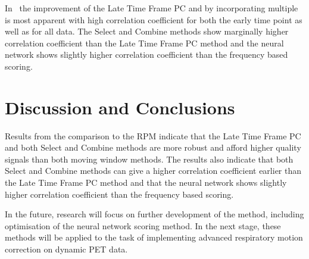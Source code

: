     In~ the improvement of the Late Time Frame \gls{PC} and by incorporating multiple  is most apparent with high correlation coefficient for both the early time point as well as for all data. The Select and Combine methods show marginally higher correlation coefficient than the Late Time Frame \gls{PC} method and the neural network shows slightly higher correlation coefficient than the frequency based scoring.
    

\vspace{-0.3cm}

\section{Discussion and Conclusions} \label{sec:discussion_and_conclusions}
    Results from the comparison to the \gls{RPM} indicate that the Late Time Frame \gls{PC} and both Select and Combine methods are more robust and afford higher quality signals than both moving window methods. The results also indicate that both Select and Combine methods can give a higher correlation coefficient earlier than the Late Time Frame \gls{PC} method and that the neural network shows slightly higher correlation coefficient than the frequency based scoring.
    
    In the future, research will focus on further development of the method, including optimisation of the neural network scoring method. In the next stage, these methods will be applied to the task of implementing advanced respiratory motion correction on dynamic \acrshort{PET} data.